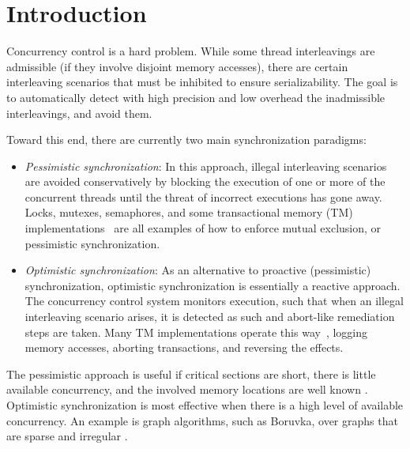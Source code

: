 \section{Introduction}\label{Se:intro}

Concurrency control is a hard problem. While some thread interleavings are admissible (if they involve disjoint memory accesses), there are certain interleaving scenarios that must be inhibited to ensure serializability. The goal is to automatically detect with high precision and low overhead the inadmissible interleavings, and avoid them.  

Toward this end, there are currently two main synchronization paradigms:
\begin{itemize}
	\item \textit{Pessimistic synchronization}: In this approach, illegal interleaving scenarios are avoided conservatively by blocking the execution of one or more of the concurrent threads until the threat of incorrect executions has gone away. Locks, mutexes, semaphores, and some transactional memory (TM) implementations~\cite{ppopp/HerlihyK08,nirpess} are all examples of how to enforce mutual exclusion, or pessimistic synchronization.
	\item \textit{Optimistic synchronization}: As an alternative to proactive (pessimistic) synchronization, optimistic synchronization is essentially a reactive approach. The concurrency control system monitors execution, such that when an illegal interleaving scenario arises, it is detected as such and abort-like remediation steps are taken. Many TM implementations operate this way~\cite{DBLP:conf/isca/HerlihyM93}, logging memory accesses, aborting transactions, and reversing the effects.
\end{itemize}

\noindent
The pessimistic approach is useful if critical sections are short, there is little available concurrency, and the involved memory locations are well known \cite{AndiKleen}. Optimistic synchronization is most effective when there is a high level of available concurrency. An example is graph algorithms, such as Boruvka, over graphs that are sparse and irregular \cite{KulkarniGalois}.
%


